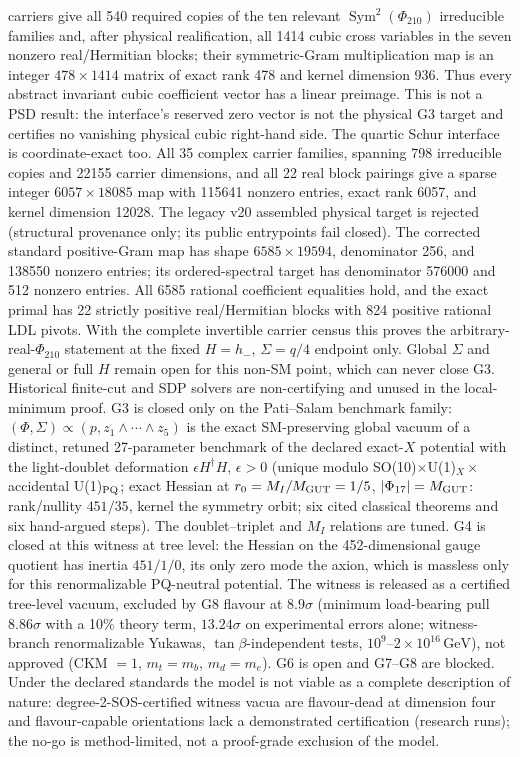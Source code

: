 \documentclass[11pt,a4paper]{article}
\newcommand{\GeV}{\,\mathrm{GeV}}
\begin{document}
carriers give all 540 required copies of the ten relevant
$\operatorname{Sym}^2(\Phi_{210})$ irreducible families and, after physical
realification, all 1414 cubic cross variables in the seven
nonzero real/Hermitian blocks; their symmetric-Gram multiplication map is an
integer $478\times1414$ matrix of exact rank 478 and kernel dimension 936.
Thus every abstract invariant cubic coefficient vector has a linear preimage.
This is not a PSD result: the interface's reserved zero vector
is not the physical G3 target and certifies no
vanishing physical cubic right-hand side.
The quartic Schur interface is coordinate-exact too.
All 35 complex carrier families, spanning 798 irreducible copies and 22155
carrier dimensions, and all 22 real block pairings give a sparse integer
$6057\times18085$ map with 115641 nonzero entries, exact rank 6057, and
kernel dimension 12028. The legacy v20 assembled physical target is rejected
(structural provenance only; its public entrypoints fail closed).
The corrected standard
positive-Gram map has shape $6585\times19594$, denominator 256, and
138550 nonzero entries; its ordered-spectral target has denominator
576000 and 512 nonzero entries. All 6585 rational coefficient equalities hold,
and the exact primal has 22 strictly positive real/Hermitian blocks
with 824 positive rational LDL pivots. With the complete invertible
carrier census this proves the arbitrary-real-$\Phi_{210}$ statement at the
fixed $H=h_-$, $\Sigma=q/4$ endpoint only. Global $\Sigma$ and general or full
$H$ remain open for this non-SM point, which can never close G3.
Historical finite-cut and SDP solvers are non-certifying and unused in the
local-minimum proof. G3 is closed only on the Pati--Salam benchmark family:
$(\Phi,\Sigma)\propto(p,z_1\wedge\cdots\wedge z_5)$ is the exact
SM-preserving global vacuum of a distinct, retuned 27-parameter benchmark of the declared
exact-$X$ potential with the light-doublet deformation $\epsilon H^\dagger H$,
$\epsilon>0$ (unique modulo SO(10)$\times$U(1)$_X\times$ accidental
U(1)$_{\rm PQ}$; exact Hessian at $r_0=M_I/M_{\rm GUT}=1/5$,
$|\Phi_{17}|=M_{\rm GUT}$: rank/nullity $451/35$, kernel the symmetry
orbit; six cited classical theorems and six hand-argued steps). The
doublet--triplet and $M_I$ relations are tuned. G4 is closed at this witness
at tree level: the Hessian on the 452-dimensional gauge quotient has inertia
$451/1/0$, its only zero mode the axion, which is massless only for this
renormalizable PQ-neutral potential. The witness is released as a certified
tree-level vacuum, excluded by G8 flavour at $8.9\sigma$ (minimum
load-bearing pull $8.86\sigma$ with a 10\% theory term, $13.24\sigma$ on
experimental errors alone; witness-branch renormalizable Yukawas,
$\tan\beta$-independent tests, $10^9$--$2\times10^{16}\GeV$), not approved
(CKM $=1$, $m_t=m_b$, $m_d=m_e$). G6 is open and G7--G8 are blocked. Under the declared standards the model is not viable as a complete
description of nature: degree-2-SOS-certified witness vacua are flavour-dead
at dimension four and flavour-capable orientations lack a demonstrated
certification (research runs); the no-go is method-limited, not a
proof-grade exclusion of the model.
\end{document}
